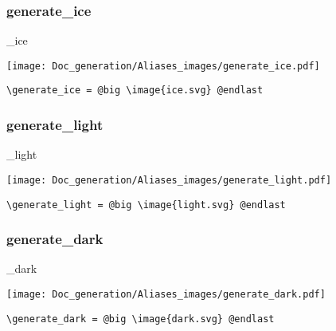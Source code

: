 \documentclass{article}
\begin{document}
\subsubsection{generate\_ice}
\begin{minipage}{0.45\linewidth}
\raggedright
\begin{spverbatim}
\generate_ice
\end{spverbatim}
\end{minipage}
\begin{minipage}{0.45\linewidth}
\raggedleft
\texttt{[image: Doc\_generation/Aliases\_images/generate\_ice.pdf]}
\end{minipage}
\begin{center}
\begin{BVerbatim}
\generate_ice = @big \image{ice.svg} @endlast
\end{BVerbatim}
\end{center}

\subsubsection{generate\_light}
\begin{minipage}{0.45\linewidth}
\raggedright
\begin{spverbatim}
\generate_light
\end{spverbatim}
\end{minipage}
\begin{minipage}{0.45\linewidth}
\raggedleft
\texttt{[image: Doc\_generation/Aliases\_images/generate\_light.pdf]}
\end{minipage}
\begin{center}
\begin{BVerbatim}
\generate_light = @big \image{light.svg} @endlast
\end{BVerbatim}
\end{center}

\subsubsection{generate\_dark}
\begin{minipage}{0.45\linewidth}
\raggedright
\begin{spverbatim}
\generate_dark
\end{spverbatim}
\end{minipage}
\begin{minipage}{0.45\linewidth}
\raggedleft
\texttt{[image: Doc\_generation/Aliases\_images/generate\_dark.pdf]}
\end{minipage}
\begin{center}
\begin{BVerbatim}
\generate_dark = @big \image{dark.svg} @endlast
\end{BVerbatim}
\end{center}
\end{document}
